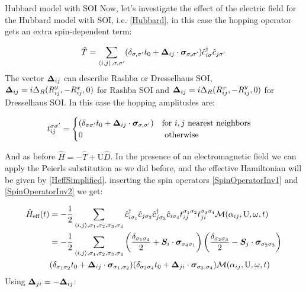 \begin{section}{Hubbard model with SOI}
\label{Section3HubbardSOI}
Now, let's investigate the effect of the electric field for the Hubbard model with SOI, i.e. \ref{Hubbard}, in this case the hopping operator gets an extra spin-dependent term:

\begin{equation}
\hat{T} = \sum_{\langle i,j \rangle, \sigma, \sigma'}(\delta_{\sigma, \sigma'} t_0 + \boldsymbol{\Delta}_{ij} \cdot \boldsymbol{\sigma}_{\sigma, \sigma'})\hat{c}_{i \sigma}^\dagger \hat{c}_{j \sigma'}
\end{equation}
The vector $\boldsymbol{\Delta}_{ij}$ can describe Rashba or Dresselhaus SOI, $\boldsymbol{\Delta}_{ij} = i\Delta_R(R_{ij}^y, -R_{ij}^x, 0)$ for Rashba SOI and $\boldsymbol{\Delta}_{ij} = i\Delta_R(R_{ij}^x, -R_{ij}^y, 0)$ for Dresselhaus SOI. 
In this case the hopping amplitudes are:

\begin{equation}
\label{HoppHubbSOI}
t_{ij}^{\sigma \sigma'} = \begin{cases}
	(\delta_{\sigma \sigma'}t_0+\boldsymbol{\Delta}_{ij} \cdot \boldsymbol{\sigma}_{\sigma, \sigma'}) & \text{for } i, j \text{ nearest neighbors} \\
	0 & \text{ otherwise}
\end{cases} \quad
\end{equation}

And as before $\hat{H} = -\hat{T} + \text{U}\hat{D}$. In the presence of an electromagnetic field we can apply the Peierls substitution as we did before, and the effective Hamiltonian will be given by \ref{HeffSimplified}.  inserting the spin operators \ref{SpinOperatorInv1} and \ref{SpinOperatorInv2} we get:

\begin{align}
\hat{H}_{\text{eff}}(t) &= - \frac{1}{2} \sum_{\langle i,j \rangle, \sigma_1, \sigma_2, \sigma_3, \sigma_4}\hat{c}_{i \sigma_1}^\dagger \hat{c}_{j \sigma_2} \hat{c}_{j \sigma_3}^\dagger \hat{c}_{i \sigma_4} t_{ij}^{\sigma_1 \sigma_2} t_{ji}^{\sigma_3 \sigma_4} \mathcal{M}(\alpha_{ij}, \text{U}, \omega, t) \nonumber \\
&= - \frac{1}{2} \sum_{\langle i,j \rangle, \sigma_1, \sigma_2, \sigma_3, \sigma_4} \left( \frac{\delta_{\sigma_1 \sigma_4}}{2} + \boldsymbol{S}_i\cdot\boldsymbol{\sigma}_{\sigma_4 \sigma_1} \right) \left( \frac{\delta_{\sigma_2 \sigma_3}}{2} - \boldsymbol{S}_j\cdot\boldsymbol{\sigma}_{\sigma_2 \sigma_3} \right) \nonumber \\ &(\delta_{\sigma_1 \sigma_2}t_0+\boldsymbol{\Delta}_{ij}\cdot \boldsymbol{\sigma}_{\sigma_1, \sigma_2}) (\delta_{\sigma_3 \sigma_4}t_0+\boldsymbol{\Delta}_{ji}\cdot \boldsymbol{\sigma}_{\sigma_3, \sigma_4}) \mathcal{M}(\alpha_{ij}, \text{U}, \omega, t) \label{HeffHubbSOI1}
\end{align}
Using $\boldsymbol{\Delta}_{ji} = - \boldsymbol{\Delta}_{ij}$:


\end{section}
